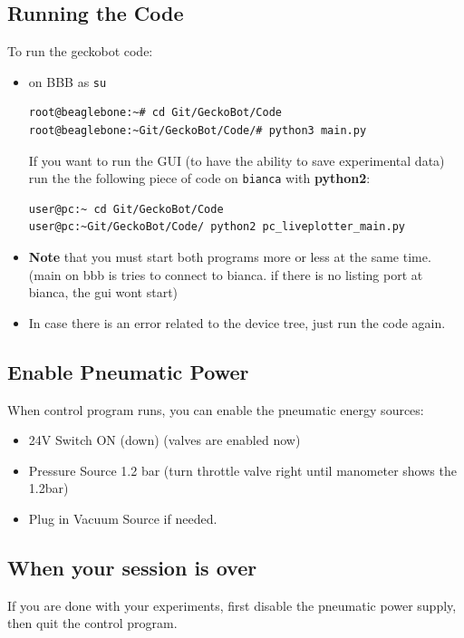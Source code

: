 \documentclass[
	fontsize=10pt
	paper=a4
]{scrartcl}
\begin{document}
\subsection{Running the Code}
To run the geckobot code:
\begin{itemize}
\item on BBB as \texttt{su}
\begin{lstlisting}
root@beaglebone:~# cd Git/GeckoBot/Code
root@beaglebone:~Git/GeckoBot/Code/# python3 main.py
\end{lstlisting}

If you want to run the GUI (to have the ability to save experimental data) run the the following piece of code on \texttt{bianca} with \textbf{python2}:
\begin{lstlisting}
user@pc:~ cd Git/GeckoBot/Code
user@pc:~Git/GeckoBot/Code/ python2 pc_liveplotter_main.py
\end{lstlisting}
\item \textbf{Note} that you must start both programs more or less at the same time. (main on bbb is tries to connect to bianca. if there is no listing port at bianca, the gui wont start)

\item In case there is an error related to the device tree, just run the code again.

\end{itemize}





\subsection{Enable Pneumatic Power}
When control program runs, you can enable the pneumatic energy sources:

\begin{itemize}
\item 24V Switch ON (down) (valves are enabled now)
\item Pressure Source 1.2 bar (turn throttle valve right until manometer shows the 1.2bar)
\item Plug in Vacuum Source if needed.

\end{itemize}



\subsection{When your session is over}
If you are done with your experiments, first disable the pneumatic power supply, then quit the control program.
\end{document}
